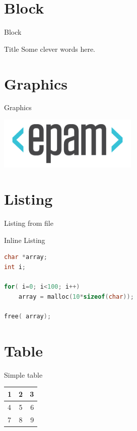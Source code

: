 \section{Block}
\begin{frame}{Block}
	\begin{block}{Title}
	    Some clever words here.
	\end{block}
\end{frame}

\section{Graphics}
\begin{frame}{Graphics}
    \begin{center}
	\includegraphics[width=0.5\textwidth]{epam}
    \end{center}
\end{frame}

\section{Listing}
\begin{frame}[fragile]{Listing from file}

    

\end{frame}

\begin{frame}[fragile]{Inline Listing}

	\begin{lstlisting}[language=C]
char *array;
int i;

for( i=0; i<100; i++)
    array = malloc(10*sizeof(char));

free( array);
	\end{lstlisting}
\end{frame}

\section{Table}

\begin{frame}{Simple table}

    \begin{tabular}{| l || c | r |}
      \hline
	  1 & 2 & 3 \\ \hline 
	  4 & 5 & 6 \\
	  7 & 8 & 9 \\
      \hline
    \end{tabular}
\end{frame}


